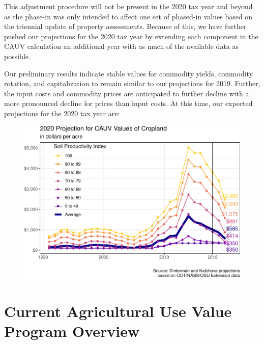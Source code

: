 \documentclass[]{article}
\begin{document}
This adjustment procedure will not be present in the 2020 tax year and
beyond as the phase-in was only intended to affect one set of phased-in
values based on the triennial update of property assessments. Because of
this, we have further pushed our projections for the 2020 tax year by
extending each component in the CAUV calculation an additional year with
as much of the available data as possible.

Our preliminary results indicate stable values for commodity yields,
commodity rotation, and capitalization to remain similar to our
projections for 2019. Further, the input costs and commodity prices are
anticipated to further decline with a more pronounced decline for prices
than input costs. At this time, our expected projections for the 2020
tax year are:

\begin{figure}[H]
\includegraphics[width=1\linewidth]{4-projections-2019-2020_files/figure-latex/exp-trend-2020-1} \caption{\label{fig:exp-trend-2020}}\label{fig:exp-trend-2020}
\end{figure}

\newpage

\hypertarget{current-agricultural-use-value-program-overview}{%
\section{Current Agricultural Use Value Program
Overview}\label{current-agricultural-use-value-program-overview}}
\end{document}
